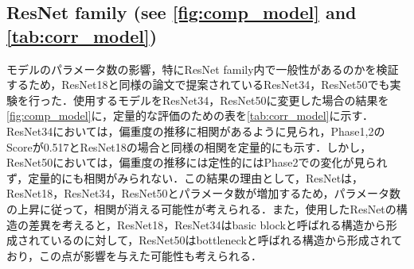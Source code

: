 \begin{table}[htb]
    \centering
    \caption{
    Correlation coefficients and scores in Phase 1, 2 and Phase 3 for different datasets.
    }
    \label{tab:corr_FTdataset}
\end{table}

\newpage

\subsection[ResNet family]{ResNet family (see \cref{fig:comp_model} and \cref{tab:corr_model})}
モデルのパラメータ数の影響，特にResNet family内で一般性があるのかを検証するため，ResNet18と同様の論文で提案されているResNet34，ResNet50でも実験を行った．使用するモデルをResNet34，ResNet50に変更した場合の結果を\cref{fig:comp_model}に，定量的な評価のための表を\cref{tab:corr_model}に示す．ResNet34においては，偏重度の推移に相関があるように見られ，Phase1,2のScoreが0.517とResNet18の場合と同様の相関を定量的にも示す．しかし，ResNet50においては，偏重度の推移には定性的にはPhase2での変化が見られず，定量的にも相関がみられない．この結果の理由として，ResNetは，ResNet18，ResNet34，ResNet50とパラメータ数が増加するため，パラメータ数の上昇に従って，相関が消える可能性が考えられる．また，使用したResNetの構造の差異を考えると，ResNet18，ResNet34はbasic blockと呼ばれる構造から形成されているのに対して，ResNet50はbottleneckと呼ばれる構造から形成されており，この点が影響を与えた可能性も考えられる．

